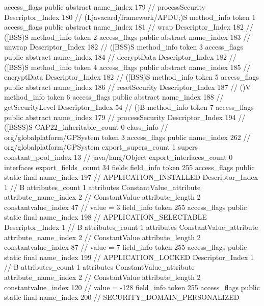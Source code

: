 {{{{{					access_flags	public abstract
					name_index	179		// processSecurity
					Descriptor_Index	180		// (Ljavacard/framework/APDU;)S
				}
				method_info {
					token	1
					access_flags	public abstract
					name_index	181		// wrap
					Descriptor_Index	182		// ([BSS)S
				}
				method_info {
					token	2
					access_flags	public abstract
					name_index	183		// unwrap
					Descriptor_Index	182		// ([BSS)S
				}
				method_info {
					token	3
					access_flags	public abstract
					name_index	184		// decryptData
					Descriptor_Index	182		// ([BSS)S
				}
				method_info {
					token	4
					access_flags	public abstract
					name_index	185		// encryptData
					Descriptor_Index	182		// ([BSS)S
				}
				method_info {
					token	5
					access_flags	public abstract
					name_index	186		// resetSecurity
					Descriptor_Index	187		// ()V
				}
				method_info {
					token	6
					access_flags	public abstract
					name_index	188		// getSecurityLevel
					Descriptor_Index	54		// ()B
				}
				method_info {
					token	7
					access_flags	public abstract
					name_index	179		// processSecurity
					Descriptor_Index	194		// ([BSSS)S
				}
			}
			CAP22_inheritable_count	0
		}
		class_info {		// org/globalplatform/GPSystem
			token	3
			access_flags	public
			name_index	262		// org/globalplatform/GPSystem
			export_supers_count	1
			supers {
				constant_pool_index	13		// java/lang/Object
			}
			export_interfaces_count	0
			interfaces {
			}
			export_fields_count	34
			fields {
			field_info {
				token	255
				access_flags	public static final
				name_index	197		// APPLICATION_INSTALLED
				Descriptor_Index	1		// B
				attributes_count	1
				attributes {
				ConstantValue_attribute {
					attribute_name_index	2		// ConstantValue
					attribute_length	2
					constantvalue_index	47		// value = 3
				}
				}
			}
			field_info {
				token	255
				access_flags	public static final
				name_index	198		// APPLICATION_SELECTABLE
				Descriptor_Index	1		// B
				attributes_count	1
				attributes {
				ConstantValue_attribute {
					attribute_name_index	2		// ConstantValue
					attribute_length	2
					constantvalue_index	87		// value = 7
				}
				}
			}
			field_info {
				token	255
				access_flags	public static final
				name_index	199		// APPLICATION_LOCKED
				Descriptor_Index	1		// B
				attributes_count	1
				attributes {
				ConstantValue_attribute {
					attribute_name_index	2		// ConstantValue
					attribute_length	2
					constantvalue_index	120		// value = -128
				}
				}
			}
			field_info {
				token	255
				access_flags	public static final
				name_index	200		// SECURITY_DOMAIN_PERSONALIZED
}}}}}
